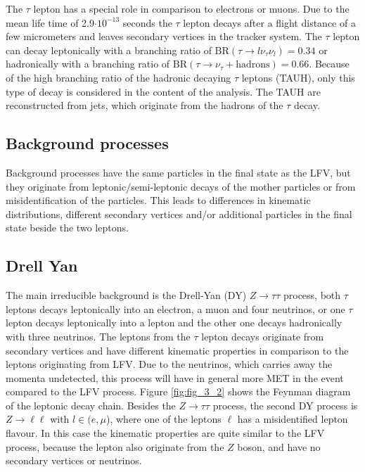The $\tau$ lepton \cite{TAU} has a special role in comparison to electrons or muons. Due to the mean life time of 2.9$\cdot 10^{-13}$ seconds the $\tau$ lepton decays after a flight distance of a few micrometers and leaves secondary vertices in the tracker system. The $\tau$ lepton can decay leptonically with a branching ratio of $\text{BR}(\tau \to l\nu_{\tau}\nu_{l}) = 0.34$ or hadronically with a branching ratio of $\text{BR}(\tau \to \nu_{\tau} + \text{hadrons}) = 0.66$. Because of the high branching ratio of the hadronic decaying $\tau$ leptons (\gls{TAUH}), only this type of decay is considered in the content of the analysis. The \gls{TAUH} are reconstructed from jets, which originate from the hadrons of the $\tau$ decay. 

\subsection{Background processes}
\label{sec:section_3_1_2}

Background processes have the same particles in the final state as the \gls{LFV}, but they originate from leptonic/semi-leptonic decays of the mother particles or from misidentification of the particles. This leads to differences in kinematic distributions, different secondary vertices and/or additional particles in the final state beside the two leptons. \\

\subsection*{Drell Yan}

The main irreducible background is the Drell-Yan (\gls{DY}) $Z\to\tau\tau$ process, both $\tau$ leptons decays leptonically into an electron, a muon and four neutrinos, or one $\tau$ lepton decays leptonically into a lepton and the other one decays hadronically with three neutrinos. The leptons from the $\tau$ lepton decays originate from secondary vertices and have different kinematic properties in comparison to the leptons originating from \gls{LFV}. Due to the neutrinos, which carries away the momenta undetected, this process will have in general more \gls{MET} in the event compared to the \gls{LFV} process. Figure \ref{fig:fig_3_2} shows the Feynman diagram of the leptonic decay chain. Besides the $Z\to\tau\tau$ process, the second \gls{DY} process is $Z\to\ell\ell$ with $l \in (e, \mu$), where one of the leptons $\ell$ has a misidentified lepton flavour. In this case the kinematic properties are quite similar to the \gls{LFV} process, because the lepton also originate from the $Z$ boson, and have no secondary vertices or neutrinos. \\


